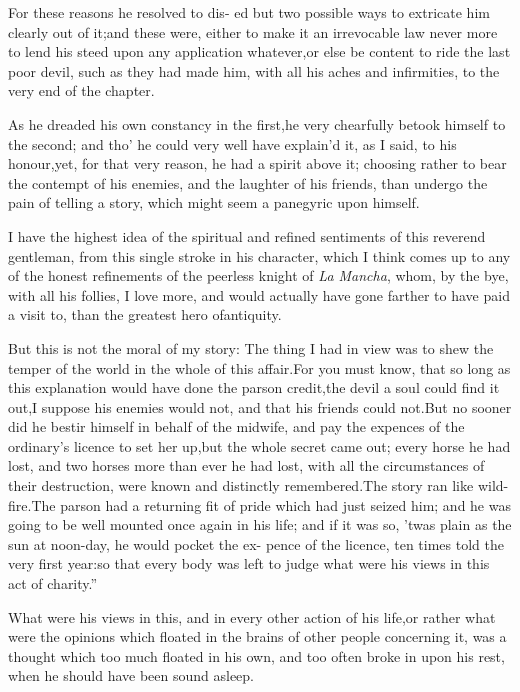 \documentclass{article}
\begin{document}
For these reasons he resolved to dis-
ed but two possible ways to extricate him clearly out
of it;\tsk  and these were, either to make it an irrevocable law
never more to lend his steed upon any application
whatever,\tsk  or else be content to ride the last poor devil,
such as they had made him, with all his aches and infirmities, to
the very end of the chapter.

As he dreaded his own constancy in the first,\tsk  he very
chearfully betook himself to the second; and tho’ he could very
well have explain’d it, as I said, to his honour,\tsk  yet, for
that very reason, he had a spirit above it; choosing rather to bear
the contempt of his enemies, and the laughter of his friends, than
undergo the pain of telling a story, which might seem a panegyric
upon himself.

I have the highest idea of the spiritual and refined sentiments of this reverend
gentleman, from this single stroke in his character, which I think comes up to any
of the honest refinements of the peerless knight of \textit{La Mancha}, whom, by the
bye, with all his follies, I love more, and would actually have gone farther to have
paid a visit to, than the greatest hero of\break antiquity.

But this is not the moral of my story: The thing I had in view
was to shew the temper of the world in the whole of this
affair.\tsk  For you must know, that so long as this explanation
would have done the parson credit,\tsk  the devil a soul could
find it out,\tsk  I suppose his enemies would not, and that his
friends could not.\tsh  But no sooner did he bestir himself in
behalf of the midwife, and pay the expences of the ordinary’s
licence to set her up,\tsk  but the whole secret came out; every
horse he had lost, and two horses more than ever he had lost,
with all the circumstances of their destruction, were known and
distinctly remembered.\tsk  The story ran like wild-fire.\tsk\lqq The parson
had\break
\lqq a returning fit of pride which had just\break
\lqq seized him; and he was going to be\break
\lqq well mounted once again in his life;\break
\lqq and if it was so, ’twas plain as the sun\break
\lqq at noon-day, he would pocket the ex-\break
\lqq pence of the licence, ten times told the\break
\lqq very first year:\tsk  so that every body\break
\lqq was left to judge what were his views\break
\lqq in this act of charity.”

What were his views in this, and in every other action of his
life,\tsk  or rather what were the opinions which floated in the
brains of other people concerning it, was a thought which too much
floated in his own, and too often broke in upon his rest, when he
should have been sound asleep.
\end{document}
